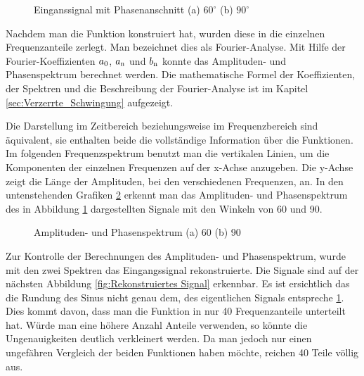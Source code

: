 \begin{figure}[h]
	\centering
	\qquad
	\caption{Einganssignal mit Phasenanschnitt (a) $60^\circ$ (b) $90^\circ$}
	\label{fig:eingangssignal_mit_Matlab}
\end{figure} 


Nachdem man die Funktion konstruiert hat, wurden diese in die einzelnen Frequenzanteile zerlegt. Man bezeichnet dies als Fourier-Analyse. Mit Hilfe der Fourier-Koeffizienten $a\textsubscript{0}$, $a\textsubscript{n}$ und $b\textsubscript{n}$ konnte das Amplituden- und Phasenspektrum berechnet werden. Die mathematische Formel der Koeffizienten, der Spektren und die Beschreibung der Fourier-Analyse ist im Kapitel \ref{sec:Verzerrte_Schwingung} aufgezeigt.
  
\newpage
Die Darstellung im Zeitbereich beziehungsweise im Frequenzbereich sind äquivalent, sie enthalten beide die vollständige Information über die Funktionen. Im folgenden Frequenzspektrum benutzt man die vertikalen Linien, um die Komponenten der einzelnen Frequenzen auf der x-Achse anzugeben. Die y-Achse zeigt die Länge der Amplituden, bei den verschiedenen Frequenzen, an. In den untenstehenden Grafiken \ref{fig:Amplituden- und Phasenspektrum} erkennt man das Amplituden- und Phasenspektrum des in Abbildung \ref{fig:eingangssignal_mit_Matlab} dargestellten Signale mit den Winkeln von 60\textdegree \hspace{0.02cm} und 90\textdegree \hspace{0.02cm}.

\begin{figure}[h]
	\centering
	\qquad
	\caption{Amplituden- und Phasenspektrum (a) 60\textdegree \hspace{0.02cm} (b) 90\textdegree}
	\label{fig:Amplituden- und Phasenspektrum}
\end{figure} 

Zur Kontrolle der Berechnungen des Amplituden- und Phasenspektrum, wurde mit den zwei Spektren das Eingangssignal rekonstruierte. Die Signale sind auf der nächsten Abbildung \ref{fig:Rekonstruiertes Signal} erkennbar. Es ist ersichtlich das die Rundung des Sinus nicht genau dem, des eigentlichen Signals entspreche \ref{fig:eingangssignal_mit_Matlab}. Dies kommt davon, dass man die Funktion in \grqq nur\grqq\hspace{0.02cm} 40 Frequenzanteile unterteilt hat. Würde man eine höhere Anzahl Anteile verwenden, so könnte die Ungenauigkeiten deutlich verkleinert werden. Da man jedoch nur einen ungefähren Vergleich der beiden Funktionen haben möchte, reichen 40 Teile völlig aus. 

